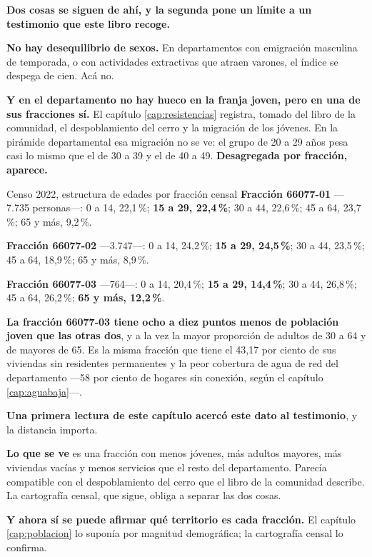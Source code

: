 \textbf{Dos cosas se siguen de ahí, y la segunda pone un límite a un testimonio que este libro
recoge.}

\textbf{No hay desequilibrio de sexos.} En departamentos con emigración masculina de temporada,
o con actividades extractivas que atraen varones, el índice se despega de cien. Acá no.

\textbf{Y en el departamento no hay hueco en la franja joven, pero en una de sus fracciones
sí.} El capítulo \ref{cap:resistencias} registra, tomado del libro de la
comunidad, el despoblamiento del cerro y la migración de los jóvenes. En la pirámide
departamental esa migración no se ve: el grupo de 20 a 29 años pesa casi lo mismo que el de 30 a
39 y el de 40 a 49. \textbf{Desagregada por fracción, aparece.}

\begin{ficha}{Censo 2022, estructura de edades por fracción censal}
\textbf{Fracción 66077-01} ---7.735 personas---: 0 a 14, 22,1\,\%; \textbf{15 a 29, 22,4\,\%};
30 a 44, 22,6\,\%; 45 a 64, 23,7\,\%; 65 y más, 9,2\,\%.

\textbf{Fracción 66077-02} ---3.747---: 0 a 14, 24,2\,\%; \textbf{15 a 29, 24,5\,\%}; 30 a 44,
23,5\,\%; 45 a 64, 18,9\,\%; 65 y más, 8,9\,\%.

\textbf{Fracción 66077-03} ---764---: 0 a 14, 20,4\,\%; \textbf{15 a 29, 14,4\,\%}; 30 a 44,
26,8\,\%; 45 a 64, 26,2\,\%; \textbf{65 y más, 12,2\,\%}.
\end{ficha}

\textbf{La fracción 66077-03 tiene ocho a diez puntos menos de población joven que las otras
dos}, y a la vez la mayor proporción de adultos de 30 a 64 y de mayores de 65. Es la misma
fracción que tiene el 43,17 por ciento de sus viviendas sin residentes permanentes y la peor
cobertura de agua de red del departamento ---58 por ciento de hogares sin conexión, según el
capítulo \ref{cap:aguabaja}---.

\begin{cautela}
\textbf{Una primera lectura de este capítulo acercó este dato al testimonio}, y la distancia importa.

\textbf{Lo que se ve} es una fracción con menos jóvenes, más adultos mayores, más viviendas
vacías y menos servicios que el resto del departamento. Parecía compatible con el despoblamiento del cerro que el libro de la comunidad describe. La cartografía censal, que sigue, obliga a separar las dos cosas.
\end{cautela}

\textbf{Y ahora sí se puede afirmar qué territorio es cada fracción.} El capítulo
\ref{cap:poblacion} lo suponía por magnitud demográfica; la cartografía censal lo confirma.

